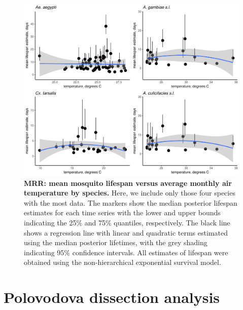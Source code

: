 \documentclass[12pt]{article}
\begin{document}
\begin{figure}[h]
	\centerline{\includegraphics[width=1\textwidth]{./Figure_files/mrr_ThreeSpeciesVersusTemperature.pdf}}
	\caption{\textbf{MRR: mean mosquito lifespan versus average monthly air temperature by species.} Here, we include only those four species with the most data. The markers show the median posterior lifespan estimates for each time series with the lower and upper bounds indicating the 25\% and 75\% quantiles, respectively. The black line shows a regression line with linear and quadratic terms estimated using the median posterior lifetimes, with the grey shading indicating 95\% confidence intervals. All estimates of lifespan were obtained using the non-hierarchical exponential survival model.}\label{fig:mrr_ThreeSpeciesVersusTemperature}
\end{figure}

\section{Polovodova dissection analysis}
\end{document}
